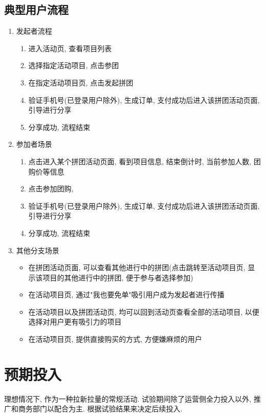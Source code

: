 \documentclass[11pt,a4paper]{article}
\begin{document}
\subsection{典型用户流程}
\label{sec:orga515ccf}
\begin{enumerate}
\item 发起者流程
\label{sec:orgbbc9b2f}
\begin{enumerate}
\item 进入活动页, 查看项目列表
\item 选择指定活动项目, 点击参团
\item 在指定活动项目页, 点击发起拼团
\item 验证手机号(已登录用户除外), 生成订单, 支付成功后进入该拼团活动页面, 引导进行分享
\item 分享成功, 流程结束
\end{enumerate}

\item 参加者场景
\label{sec:org50f784e}
\begin{enumerate}
\item 点击进入某个拼团活动页面, 看到项目信息, 结束倒计时, 当前参加人数, 团购价等信息
\item 点击参加团购,
\item 验证手机号(已登录用户除外), 生成订单, 支付成功后进入该拼团活动页面, 引导进行分享
\item 分享成功, 流程结束
\end{enumerate}

\item 其他分支场景
\label{sec:org523ec1d}
\begin{itemize}
\item 在拼团活动页面, 可以查看其他进行中的拼团(点击跳转至活动项目页, 显示该项目的其他进行中的拼团, 便于参与者选择参加)
\item 在活动项目页, 通过"我也要免单"吸引用户成为发起者进行传播
\item 在活动项目以及拼团活动页, 均可以回到活动页查看全部的活动项目, 以便选择对用户更有吸引力的项目
\item 在活动项目页, 提供直接购买的方式, 方便嫌麻烦的用户
\end{itemize}
\end{enumerate}

\section{预期投入}
\label{sec:org8c41b6f}
理想情况下, 作为一种拉新拉量的常规活动. 试验期间除了运营侧全力投入以外, 推广和商务部门以配合为主. 根据试验结果来决定后续投入.
\end{document}
